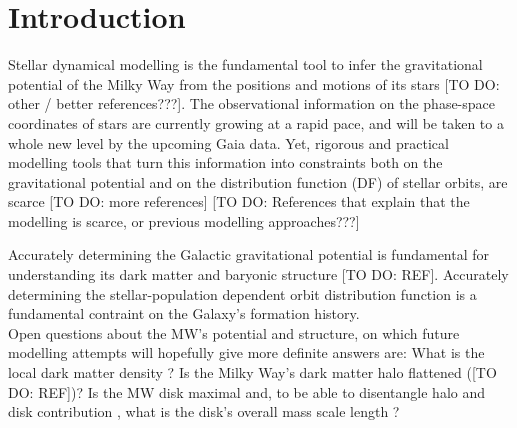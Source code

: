 \section{Introduction} \label{sec:intro}

Stellar dynamical modelling is the fundamental tool to infer the gravitational potential of the Milky Way from the positions and motions of its stars \citep{rix13,bin11b,bin08} [TO DO: other / better references???]. The observational information on the phase-space coordinates of stars are currently growing at a rapid pace, and will be taken to a whole new level by the upcoming Gaia data. Yet, rigorous and practical modelling tools that turn this information into constraints both on the gravitational potential and on the distribution function (DF) of stellar orbits, are scarce \citep{rix13} [TO DO: more references] [TO DO: References that explain that the modelling is scarce, or previous modelling approaches???]




Accurately determining the Galactic gravitational potential is fundamental for understanding its dark matter and baryonic structure [TO DO: REF]. Accurately determining the stellar-population dependent orbit distribution function is a fundamental contraint on the Galaxy's formation history. \\

Open questions about the MW's potential and structure, on which future modelling attempts will hopefully give more definite answers are: What is the local dark matter density \citep{zha13,bt12}? Is the Milky Way's dark matter halo flattened ([TO DO: REF])? Is the MW disk maximal \citep{sac97} and, to be able to disentangle halo and disk contribution \citep{deh98}, what is the disk's overall mass scale length \citep{bov13}?  \\

